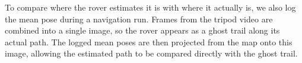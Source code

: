 To compare where the rover estimates it is with where it actually is, we also log the mean pose
during a navigation run. Frames from the tripod video are combined into a single image, so the
rover appears as a ghost trail along its actual path. The logged mean poses are then projected
from the map onto this image, allowing the estimated path to be compared directly with the
ghost trail.




